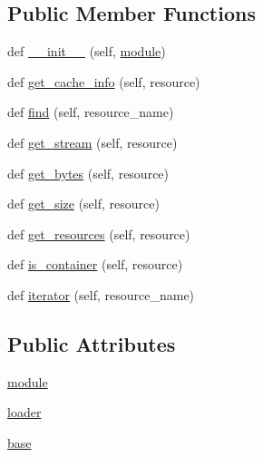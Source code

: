 \subsection*{Public Member Functions}
\begin{DoxyCompactItemize}
\item 
def \hyperlink{classpip_1_1__vendor_1_1distlib_1_1resources_1_1ResourceFinder_a80b72ae77b9a4691d2e8005db608d384}{\+\_\+\+\_\+init\+\_\+\+\_\+} (self, \hyperlink{classpip_1_1__vendor_1_1distlib_1_1resources_1_1ResourceFinder_a9b3f8038afd5558680e180ea2a31a738}{module})
\item 
def \hyperlink{classpip_1_1__vendor_1_1distlib_1_1resources_1_1ResourceFinder_ade1a0233dd16b8aed8b630ca99480993}{get\+\_\+cache\+\_\+info} (self, resource)
\item 
def \hyperlink{classpip_1_1__vendor_1_1distlib_1_1resources_1_1ResourceFinder_a7c8f54e1f192d86745bf8ea4148d9203}{find} (self, resource\+\_\+name)
\item 
def \hyperlink{classpip_1_1__vendor_1_1distlib_1_1resources_1_1ResourceFinder_a6e2db103910e8ed6f94508f3a966a8be}{get\+\_\+stream} (self, resource)
\item 
def \hyperlink{classpip_1_1__vendor_1_1distlib_1_1resources_1_1ResourceFinder_a7b5055fc687c78fdaac750955ebdf5c3}{get\+\_\+bytes} (self, resource)
\item 
def \hyperlink{classpip_1_1__vendor_1_1distlib_1_1resources_1_1ResourceFinder_abf7d3803b1222d1b205f5076f31286d8}{get\+\_\+size} (self, resource)
\item 
def \hyperlink{classpip_1_1__vendor_1_1distlib_1_1resources_1_1ResourceFinder_a0affa545f475e4883d5c2a87e98e39fb}{get\+\_\+resources} (self, resource)
\item 
def \hyperlink{classpip_1_1__vendor_1_1distlib_1_1resources_1_1ResourceFinder_a9139d97cf587ad566708374aa5da811f}{is\+\_\+container} (self, resource)
\item 
def \hyperlink{classpip_1_1__vendor_1_1distlib_1_1resources_1_1ResourceFinder_ab0f86812727cc97d40911589de5511bc}{iterator} (self, resource\+\_\+name)
\end{DoxyCompactItemize}
\subsection*{Public Attributes}
\begin{DoxyCompactItemize}
\item 
\hyperlink{classpip_1_1__vendor_1_1distlib_1_1resources_1_1ResourceFinder_a9b3f8038afd5558680e180ea2a31a738}{module}
\item 
\hyperlink{classpip_1_1__vendor_1_1distlib_1_1resources_1_1ResourceFinder_a00ca5ff465ef63dbeeec3e7ece3b7b7a}{loader}
\item 
\hyperlink{classpip_1_1__vendor_1_1distlib_1_1resources_1_1ResourceFinder_a97b9bb11a64700be3945ddd66222499f}{base}
\end{DoxyCompactItemize}

